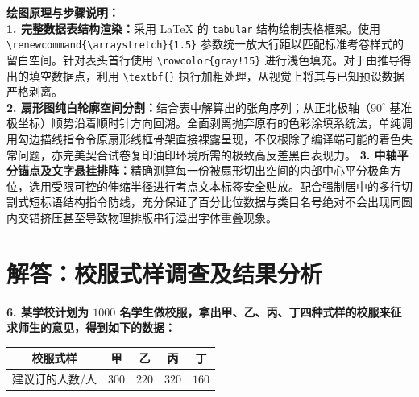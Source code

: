 \vspace{0.6cm}

{\small\color{blue!70!black}
\textbf{绘图原理与步骤说明：}\\
\textbf{1. 完整数据表结构渲染：}采用 LaTeX 的 \texttt{tabular} 结构绘制表格框架。使用 \texttt{\textbackslash renewcommand\{\textbackslash arraystretch\}\{1.5\}} 参数统一放大行距以匹配标准考卷样式的留白空间。针对表头首行使用 \texttt{\textbackslash rowcolor\{gray!15\}} 进行浅色填充。对于由推导得出的填空数据点，利用 \texttt{\textbackslash textbf\{\}} 执行加粗处理，从视觉上将其与已知预设数据严格剥离。\\
\textbf{2. 扇形图纯白轮廓空间分割：}结合表中解算出的张角序列；从正北极轴（$90^\circ$ 基准极坐标）顺势沿着顺时针方向回溯。全面剥离抛弃原有的色彩涂填系统法，单纯调用勾边描线指令令原扇形线框骨架直接裸露呈现，不仅根除了编译端可能的着色失常问题，亦完美契合试卷复印油印环境所需的极致高反差黑白表现力。
\textbf{3. 中轴平分锚点及文字悬挂排阵：}精确测算每一份被扇形切出空间的内部中心平分极角方位，选用受限可控的伸缩半径进行考点文本标签安全贴放。配合强制居中的多行切割式短标语结构指令防线，充分保证了百分比位数据与类目名号绝对不会出现同圆内交错挤压甚至导致物理排版串行溢出字体重叠现象。
}

\newpage



\newpage

\section{解答：校服式样调查及结果分析}

\vspace{0.6cm}

\textbf{6. 某学校计划为 $1000$ 名学生做校服，拿出甲、乙、丙、丁四种式样的校服来征求师生的意见，得到如下的数据：}

\vspace{0.2cm}
\begin{center}
\renewcommand{\arraystretch}{1.5}
\begin{tabular}{|c|c|c|c|c|}
  \hline
  \rowcolor{gray!15} 
  校服式样 & 甲 & 乙 & 丙 & 丁 \\
  \hline
  建议订的人数/人 & $300$ & $220$ & $320$ & $160$ \\
  \hline
\end{tabular}
\end{center}
\vspace{0.2cm}

